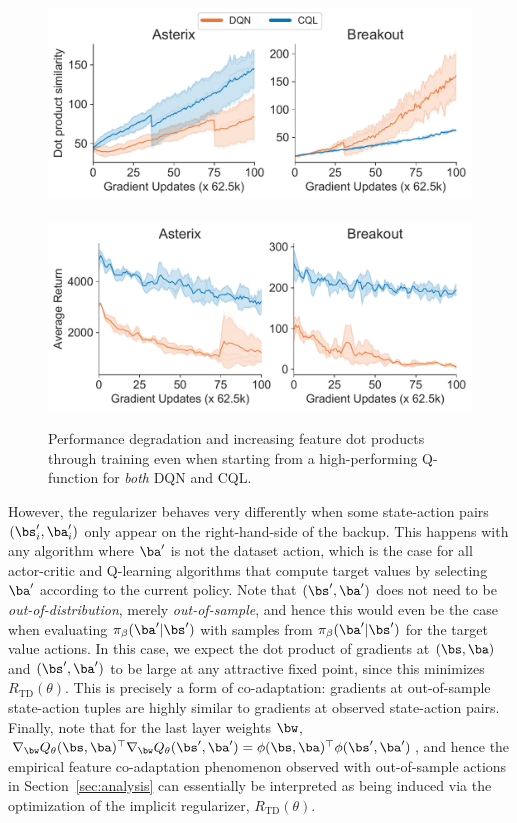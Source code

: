 \begin{figure}
    \centering
    \vspace{-18pt}
    \includegraphics[width=0.95\linewidth]{figures/figure3_neurips_stability_cql_dot_product_both_dot_product.pdf}\\
    ~~~\includegraphics[width=0.93\linewidth]{figures/figure3_neurips_stability_cql_dot_product_both_return.pdf}
    \vspace{-0.3cm}
    \caption{\small{Performance degradation and increasing feature dot products through training even when starting from a high-performing Q-function for \emph{both} DQN and CQL.}}  
    \label{fig:stability}
    \vspace{-0.5cm}
\end{figure}
However, the regularizer behaves very differently when some state-action pairs $(\bs'_i, \ba'_i)$ only appear on the right-hand-side of the backup. This happens with any algorithm where $\ba'$ is not the dataset action, which is the case for all actor-critic and Q-learning algorithms that compute target values by selecting $\ba'$ according to the current policy. Note that $(\bs',\ba')$ does not need to be \emph{out-of-distribution}, merely \emph{out-of-sample}, and hence this would even be the case when evaluating $\pi_\beta(\ba'|\bs')$ with samples from $\pi_\beta(\ba'|\bs')$ for the target value actions.
In this case, we expect the dot product of gradients at $(\bs, \ba)$ and $(\bs', \ba')$ to be large at any attractive fixed point, since this minimizes $R_\mathrm{TD}(\theta)$. This is precisely a form of co-adaptation: gradients at out-of-sample state-action tuples are highly similar to gradients at observed state-action pairs.
Finally, note that for the last layer weights $\bw$, $\nabla_\bw Q_\theta(\bs, \ba)^\top \nabla_\bw Q_\theta(\bs', \ba') = \phi(\bs, \ba)^\top\phi(\bs', \ba')$, and hence the empirical feature co-adaptation phenomenon observed with out-of-sample actions in Section~\ref{sec:analysis} can essentially be interpreted as being induced via the optimization of the implicit regularizer, $R_\mathrm{TD}(\theta)$.

